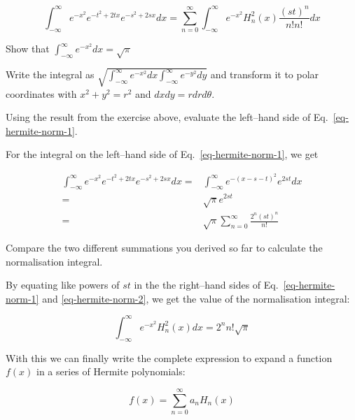 \begin{equation}
\int_{-\infty}^{\infty} e^{-x^2} e^{-t^2 + 2tx} e^{-s^2 + 2sx} dx= \sum_{n = 0}^{\infty} \int_{-\infty}^{\infty} e^{-x^2} H_n^2(x)\frac{(st)^n}{n!n!} dx \label{eq-hermite-norm-1}
\end{equation}

\begin{exer}
Show that $\int_{-\infty}^{\infty}e^{-x^2}dx = \sqrt{\pi}$
\begin{hnt}
Write the integral as $\sqrt{\int_{-\infty}^{\infty} e^{-x^2}dx\int_{-\infty}^{\infty} e^{-y^2}dy}$ and transform it to polar coordinates with $x^2+y^2=r^2$ and $dxdy = r dr d\theta$.
\end{hnt}
\end{exer}

\begin{cue}
Using the result from the exercise above, evaluate the left--hand side of Eq.~\ref{eq-hermite-norm-1}.
\end{cue}

For the integral on the left--hand side of Eq.~\ref{eq-hermite-norm-1}, we get 

\begin{align}
\int_{-\infty}^{\infty} e^{-x^2} e^{-t^2 + 2tx} e^{-s^2 + 2sx} dx 
  = & \int_{-\infty}^{\infty} e^{-(x-s-t)^2} e^{2st}dx \nonumber \\
  = & \sqrt{\pi} e^{2st} \nonumber \\
  = & \sqrt{\pi} \sum_{n = 0}^{\infty} \frac{2^n{(st)}^n}{n!}  \label{eq-hermite-norm-2}
\end{align} 

\begin{cue}
Compare the two different summations you derived so far to calculate the normalisation integral.
\end{cue}

By equating like powers of $st$ in the the right--hand sides of Eq.~\ref{eq-hermite-norm-1} and \ref{eq-hermite-norm-2}, we get the value of the normalisation integral:

\begin{equation}
\int_{-\infty}^{\infty} e^{-x^2} H_n^2(x) dx = 2^n n! \sqrt{\pi}
\end{equation} 

With this we can finally write the complete expression to expand a function $f(x)$ in a series of Hermite polynomials:

\begin{equation}
f(x) = \sum_{n=0}^{\infty}a_n H_n(x)
\end{equation} 

